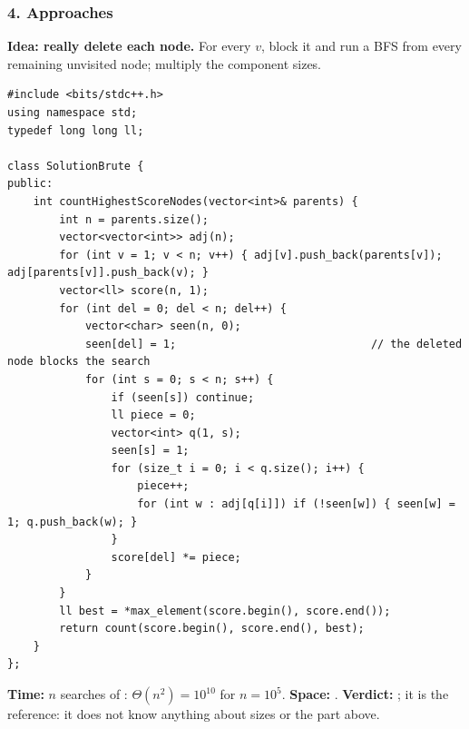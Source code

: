 \subsubsection*{4. Approaches}

\begin{bruteforcebox}
\textbf{Idea: really delete each node.} For every $v$, block it and run a BFS from every remaining unvisited node; multiply the component sizes.

\begin{lstlisting}[style=cpp]
#include <bits/stdc++.h>
using namespace std;
typedef long long ll;

class SolutionBrute {
public:
    int countHighestScoreNodes(vector<int>& parents) {
        int n = parents.size();
        vector<vector<int>> adj(n);
        for (int v = 1; v < n; v++) { adj[v].push_back(parents[v]); adj[parents[v]].push_back(v); }
        vector<ll> score(n, 1);
        for (int del = 0; del < n; del++) {
            vector<char> seen(n, 0);
            seen[del] = 1;                              // the deleted node blocks the search
            for (int s = 0; s < n; s++) {
                if (seen[s]) continue;
                ll piece = 0;
                vector<int> q(1, s);
                seen[s] = 1;
                for (size_t i = 0; i < q.size(); i++) {
                    piece++;
                    for (int w : adj[q[i]]) if (!seen[w]) { seen[w] = 1; q.push_back(w); }
                }
                score[del] *= piece;
            }
        }
        ll best = *max_element(score.begin(), score.end());
        return count(score.begin(), score.end(), best);
    }
};
\end{lstlisting}

\begin{complexitybox}
\textbf{Time:} $n$ searches of : $\Theta(n^2) = 10^{10}$ for $n = 10^5$. \textbf{Space:} . \textbf{Verdict:} \tle; it is the reference: it does not know anything about sizes or the part above.
\end{complexitybox}
\end{bruteforcebox}

